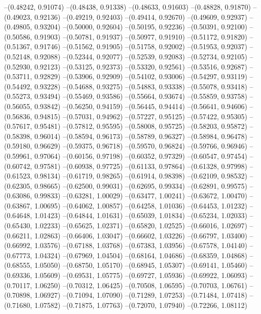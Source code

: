 --(0.48242, 0.91074)
--(0.48438, 0.91338)
--(0.48633, 0.91603)
--(0.48828, 0.91870)
--(0.49023, 0.92136)
--(0.49219, 0.92403)
--(0.49414, 0.92670)
--(0.49609, 0.92937)
--(0.49805, 0.93204)
--(0.50000, 0.92604)
--(0.50195, 0.92236)
--(0.50391, 0.92100)
--(0.50586, 0.91903)
--(0.50781, 0.91937)
--(0.50977, 0.91910)
--(0.51172, 0.91820)
--(0.51367, 0.91746)
--(0.51562, 0.91905)
--(0.51758, 0.92002)
--(0.51953, 0.92037)
--(0.52148, 0.92088)
--(0.52344, 0.92077)
--(0.52539, 0.92083)
--(0.52734, 0.92105)
--(0.52930, 0.92123)
--(0.53125, 0.92373)
--(0.53320, 0.92561)
--(0.53516, 0.92687)
--(0.53711, 0.92829)
--(0.53906, 0.92909)
--(0.54102, 0.93006)
--(0.54297, 0.93119)
--(0.54492, 0.93228)
--(0.54688, 0.93275)
--(0.54883, 0.93338)
--(0.55078, 0.93418)
--(0.55273, 0.93494)
--(0.55469, 0.93586)
--(0.55664, 0.93674)
--(0.55859, 0.93758)
--(0.56055, 0.93842)
--(0.56250, 0.94159)
--(0.56445, 0.94414)
--(0.56641, 0.94606)
--(0.56836, 0.94815)
--(0.57031, 0.94962)
--(0.57227, 0.95125)
--(0.57422, 0.95305)
--(0.57617, 0.95481)
--(0.57812, 0.95595)
--(0.58008, 0.95725)
--(0.58203, 0.95872)
--(0.58398, 0.96014)
--(0.58594, 0.96173)
--(0.58789, 0.96327)
--(0.58984, 0.96478)
--(0.59180, 0.96629)
--(0.59375, 0.96718)
--(0.59570, 0.96824)
--(0.59766, 0.96946)
--(0.59961, 0.97064)
--(0.60156, 0.97198)
--(0.60352, 0.97329)
--(0.60547, 0.97454)
--(0.60742, 0.97581)
--(0.60938, 0.97725)
--(0.61133, 0.97864)
--(0.61328, 0.97998)
--(0.61523, 0.98134)
--(0.61719, 0.98265)
--(0.61914, 0.98398)
--(0.62109, 0.98532)
--(0.62305, 0.98665)
--(0.62500, 0.99031)
--(0.62695, 0.99334)
--(0.62891, 0.99575)
--(0.63086, 0.99833)
--(0.63281, 1.00029)
--(0.63477, 1.00241)
--(0.63672, 1.00470)
--(0.63867, 1.00695)
--(0.64062, 1.00857)
--(0.64258, 1.01036)
--(0.64453, 1.01232)
--(0.64648, 1.01423)
--(0.64844, 1.01631)
--(0.65039, 1.01834)
--(0.65234, 1.02033)
--(0.65430, 1.02233)
--(0.65625, 1.02371)
--(0.65820, 1.02525)
--(0.66016, 1.02697)
--(0.66211, 1.02863)
--(0.66406, 1.03047)
--(0.66602, 1.03226)
--(0.66797, 1.03400)
--(0.66992, 1.03576)
--(0.67188, 1.03768)
--(0.67383, 1.03956)
--(0.67578, 1.04140)
--(0.67773, 1.04324)
--(0.67969, 1.04504)
--(0.68164, 1.04686)
--(0.68359, 1.04868)
--(0.68555, 1.05050)
--(0.68750, 1.05170)
--(0.68945, 1.05307)
--(0.69141, 1.05460)
--(0.69336, 1.05609)
--(0.69531, 1.05775)
--(0.69727, 1.05936)
--(0.69922, 1.06093)
--(0.70117, 1.06250)
--(0.70312, 1.06425)
--(0.70508, 1.06595)
--(0.70703, 1.06761)
--(0.70898, 1.06927)
--(0.71094, 1.07090)
--(0.71289, 1.07253)
--(0.71484, 1.07418)
--(0.71680, 1.07582)
--(0.71875, 1.07763)
--(0.72070, 1.07940)
--(0.72266, 1.08112)
